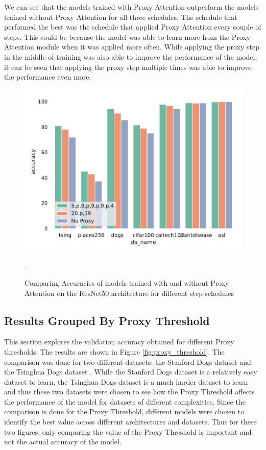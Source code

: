 \documentclass[a4paper,11pt,openright]{book}
\begin{document}
We can see that the models trained with Proxy Attention outperform the models trained without Proxy Attention for all three schedules. The schedule that performed the best was the schedule that applied Proxy Attention every couple of steps. This could be because the model was able to learn more from the Proxy Attention module when it was applied more often. While applying the proxy step in the middle of training was also able to improve the performance of the model, it can be seen that applying the proxy step multiple times was able to improve the performance even more.
\begin{figure}[!htb]
    \centering
    \includegraphics[width=.6\textwidth]{results/schedule_resnet50.pdf}
    \caption{Comparing Accuracies of models trained with and without Proxy Attention on the ResNet50 \cite{heDeepResidualLearning2016} architecture for different step schedules}.
    \label{fig:schedresnet50_results}
\end{figure}

\subsection{Results Grouped By Proxy Threshold}
This section explores the validation accuracy obtained for different Proxy thresholds. The results are shown in Figure \ref{fig:proxy_threshold}. 
The comparison was done for two different datasets: the Stanford Dogs dataset \cite{khoslaNovelDatasetFineGrained} and the Tsinghua Dogs dataset \cite{zouNewDatasetDog2020}. While the Stanford Dogs dataset is a relatively easy dataset to learn, the Tsinghua Dogs dataset is a much harder dataset to learn and thus these two datasets were chosen to see how the Proxy Threshold affects the performance of the model for datasets of different complexities. Since the comparison is done for the Proxy Threshold, different models were chosen to identify the best value across different architectures and datasets. Thus for these two figures, only comparing the value of the Proxy Threshold is important and not the actual accuracy of the model.
\end{document}
